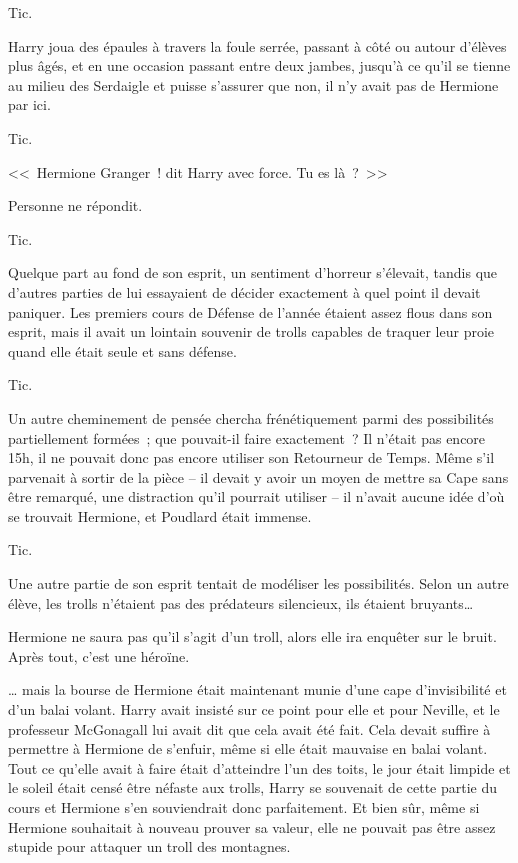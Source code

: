 Tic.

Harry joua des épaules à travers la foule serrée, passant à côté ou autour d'élèves plus âgés, et en une occasion passant entre deux jambes, jusqu'à ce qu'il se tienne au milieu des Serdaigle et puisse s'assurer que non, il n'y avait pas de Hermione par ici.

Tic.

<<~Hermione Granger~! dit Harry avec force. Tu es là~?~>>

Personne ne répondit.

Tic.

Quelque part au fond de son esprit, un sentiment d'horreur s'élevait, tandis que d'autres parties de lui essayaient de décider exactement à quel point il devait paniquer. Les premiers cours de Défense de l'année étaient assez flous dans son esprit, mais il avait un lointain souvenir de trolls capables de traquer leur proie quand elle était seule et sans défense.

Tic.

Un autre cheminement de pensée chercha frénétiquement parmi des possibilités partiellement formées~; que pouvait-il faire exactement~? Il n'était pas encore 15h, il ne pouvait donc pas encore utiliser son Retourneur de Temps. Même s'il parvenait à sortir de la pièce -- il devait y avoir un moyen de mettre sa Cape sans être remarqué, une distraction qu'il pourrait utiliser -- il n'avait aucune idée d'où se trouvait Hermione, et Poudlard était immense.

Tic.

Une autre partie de son esprit tentait de modéliser les possibilités. Selon un autre élève, les trolls n'étaient pas des prédateurs silencieux, ils étaient bruyants…

Hermione ne saura pas qu'il s'agit d'un troll, alors elle ira enquêter sur le bruit. Après tout, c'est une héroïne.

… mais la bourse de Hermione était maintenant munie d'une cape d'invisibilité et d'un balai volant. Harry avait insisté sur ce point pour elle et pour Neville, et le professeur McGonagall lui avait dit que cela avait été fait. Cela devait suffire à permettre à Hermione de s'enfuir, même si elle était mauvaise en balai volant. Tout ce qu'elle avait à faire était d'atteindre l'un des toits, le jour était limpide et le soleil était censé être néfaste aux trolls, Harry se souvenait de cette partie du cours et Hermione s'en souviendrait donc parfaitement. Et bien sûr, même si Hermione souhaitait à nouveau prouver sa valeur, elle ne pouvait pas être assez stupide pour attaquer un troll des montagnes.


